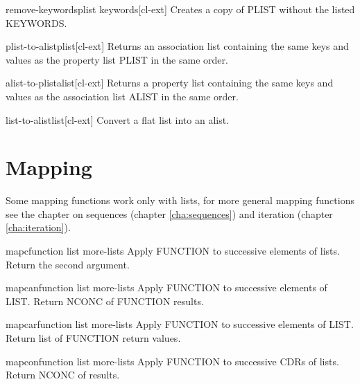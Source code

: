 \documentclass[10pt,english]{book}
\begin{document}
\begin{function}{remove-keywords}{plist \rest keywords}[cl-ext]
  Creates a copy of PLIST without the listed KEYWORDS.
\end{function}

\begin{function}{plist-to-alist}{plist}[cl-ext]
  Returns an association list containing the same keys and values as the
property list PLIST in the same order.
\end{function}

\begin{function}{alist-to-plist}{alist}[cl-ext]
  Returns a property list containing the same keys and values as the
association list ALIST in the same order.
\end{function}

\begin{function}{list-to-alist}{list}[cl-ext]
  Convert a flat list into an alist.
\end{function}

\section{Mapping}
\label{sec:mapping}

Some mapping functions work only with lists, for more general mapping
functions see the chapter on sequences (chapter \ref{cha:sequences}) and
iteration (chapter \ref{cha:iteration}).

\begin{function}{mapc}{function list \rest more-lists}
  Apply FUNCTION to successive elements of lists. Return the second argument.
\end{function}

\begin{function}{mapcan}{function list \rest more-lists}
  Apply FUNCTION to successive elements of LIST. Return NCONC of FUNCTION
   results.
\end{function}

\begin{function}{mapcar}{function list \rest more-lists}
  Apply FUNCTION to successive elements of LIST. Return list of FUNCTION
   return values.
\end{function}

\begin{function}{mapcon}{function list \rest more-lists}
  Apply FUNCTION to successive CDRs of lists. Return NCONC of results.
\end{function}
\end{document}
